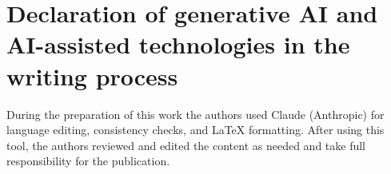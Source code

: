 \documentclass[preprint,12pt]{elsarticle}
\begin{document}
\section*{Declaration of generative AI and AI-assisted technologies in the writing process}
During the preparation of this work the authors used Claude (Anthropic) for
language editing, consistency checks, and LaTeX formatting. After using this
tool, the authors reviewed and edited the content as needed and take full
responsibility for the publication.



\end{document}
